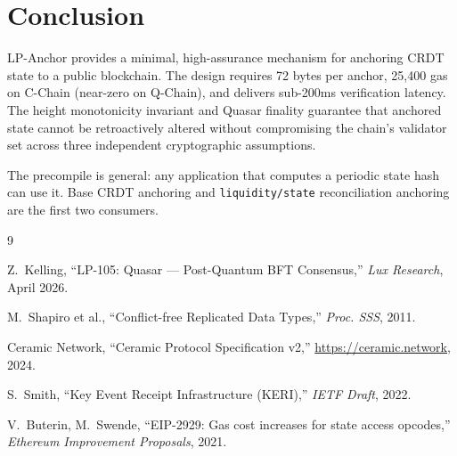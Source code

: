 \section{Conclusion}

\label{sec:conclusion}

LP-Anchor provides a minimal, high-assurance mechanism for anchoring
CRDT state to a public blockchain. The design requires 72 bytes per anchor,
25,400 gas on C-Chain (near-zero on Q-Chain), and delivers sub-200ms
verification latency. The height monotonicity invariant and Quasar finality
guarantee that anchored state cannot be retroactively altered without
compromising the chain's validator set across three independent
cryptographic assumptions.

The precompile is general: any application that computes a periodic state
hash can use it. Base CRDT anchoring and \texttt{liquidity/state}
reconciliation anchoring are the first two consumers.


\begin{thebibliography}{9}

Z.~Kelling, ``LP-105: Quasar --- Post-Quantum BFT Consensus,''
\textit{Lux Research}, April 2026.

M.~Shapiro et al., ``Conflict-free Replicated Data Types,''
\textit{Proc. SSS}, 2011.

Ceramic Network, ``Ceramic Protocol Specification v2,''
\url{https://ceramic.network}, 2024.

S.~Smith, ``Key Event Receipt Infrastructure (KERI),''
\textit{IETF Draft}, 2022.

V.~Buterin, M.~Swende, ``EIP-2929: Gas cost increases for state access opcodes,''
\textit{Ethereum Improvement Proposals}, 2021.

\end{thebibliography}

